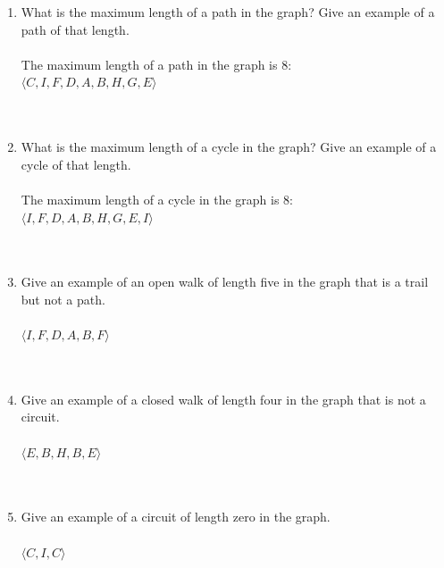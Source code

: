 \documentclass{amsart}
\theoremstyle{definition}
\theoremstyle{Exercise}
\theoremstyle{remark}
\theoremstyle{rule}
\numberwithin{equation}{section}
\begin{document}
    \begin{enumerate}[label=(\roman*)]
        \item What is the maximum length of a path in the graph? Give an example of a path of that length.\\\\
           The maximum length of a path in the graph is 8:\\
           $\langle C, I, F, D, A, B, H, G, E \rangle$\\
\\\\
        \item What is the maximum length of a cycle in the graph? Give an example of a cycle of that length.\\\\
           The maximum length of a cycle in the graph is 8:\\
           $\langle I, F, D, A, B, H, G, E, I \rangle$\\
\\\\
        \item Give an example of an open walk of length five in the graph that is a trail but not a path.\\\\
           $\langle I, F, D, A, B, F \rangle$\\
\\\\
        \item Give an example of a closed walk of length four in the graph that is not a circuit.\\\\
           $\langle E, B, H, B, E \rangle$\\
\\\\
        \item Give an example of a circuit of length zero in the graph.\\\\
           $\langle C, I, C \rangle$\\
\\\\
    \end{enumerate}
    \newpage
    

\end{document}
